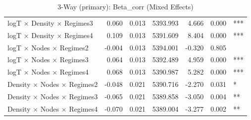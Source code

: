 \begin{table}[ht]
\begin{tabular}{lrrrrrl}
  logT × Density × Regimes3 & 0.060 & 0.013 & 5393.993 & 4.666 & 0.000 & *** \\ 
  logT × Density × Regimes4 & 0.109 & 0.013 & 5391.609 & 8.404 & 0.000 & *** \\ 
  logT × Nodes × Regimes2 & -0.004 & 0.013 & 5394.001 & -0.320 & 0.805 &  \\ 
  logT × Nodes × Regimes3 & 0.064 & 0.013 & 5392.489 & 4.959 & 0.000 & *** \\ 
  logT × Nodes × Regimes4 & 0.068 & 0.013 & 5390.987 & 5.282 & 0.000 & *** \\ 
  Density × Nodes × Regimes2 & -0.048 & 0.021 & 5390.716 & -2.270 & 0.031 & * \\ 
  Density × Nodes × Regimes3 & -0.065 & 0.021 & 5389.858 & -3.050 & 0.004 & ** \\ 
  Density × Nodes × Regimes4 & -0.070 & 0.021 & 5389.004 & -3.277 & 0.002 & ** \\ 
   \hline
\end{tabular}
\caption{3-Way (primary): Beta_corr (Mixed Effects)} 
\end{table}

